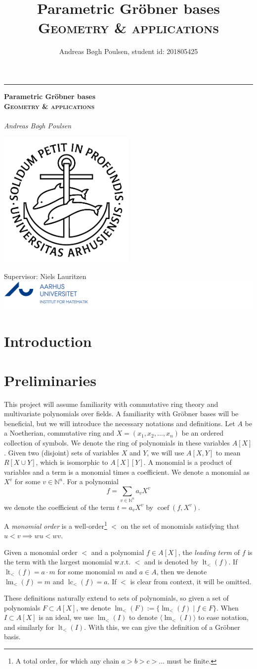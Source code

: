 \documentclass[a4paper, 12pt]{article}
\title{Parametric Gröbner bases\\{\large \textsc{Geometry \& applications}}}
\author{Andreas Bøgh Poulsen, student id: 201805425}
\newcommand{\N}{\mathbb{N}}
\DeclareMathOperator{\LT}{lt}
\DeclareMathOperator{\LM}{lm}
\DeclareMathOperator{\LC}{lc}
\DeclareMathOperator{\coef}{coef}
\theoremstyle{changedot}
\theoremstyle{changedotbreak}
\theoremstyle{nonumberplain}
\newcommand*{\titleGM}{%
\hspace*{0.2\textwidth} %
\rule{1pt}{\textheight} %
\hspace*{0.05\textwidth} %
\parbox[b]{0.75\textwidth}{ %
{\noindent\Huge\bfseries  Parametric Gröbner bases\\{\large \textsc{Geometry \& applications}}\\}\\[2\baselineskip] %
{\large \textit{Andreas Bøgh Poulsen \hfill \oldstylenums{201805425} }}\\%
{\large } %
\parbox[b][0pt]{0.5\textwidth}{
  \hspace{2cm}\includegraphics[width=0.5\textwidth]{ausegl_sort.png}
  \vspace{-10cm}
}

\vspace{0.5\textheight} %
\vfill
{\noindent Supervisor: Niels Lauritzen \hspace{2.5cm} \includegraphics{AU_logo.png}  }\\[\baselineskip] %
}%
}
\begin{document}
{}
\titleGM
\newpage
\tableofcontents

\newpage
{}

\section*{Introduction}


\section{Preliminaries}
This project will assume familiarity with commutative ring theory and multivariate polynomials over fields. A familiarity with Gröbner bases will be beneficial, but we will introduce the necessary notations and definitions. Let $A$ be a Noetherian, commutative ring and $X = (x_{1}, x_{2}, \dots, x_{n})$ be an ordered collection of symbols. We denote the ring of polynomials in these variables $A[X]$. Given two (disjoint) sets of variables $X$ and $Y$, we will use $A[X, Y]$ to mean $R[X \cup Y]$, which is isomorphic to $A[X][Y]$. A monomial is a product of variables and a term is a monomial times a coefficient. We denote a monomial as $X^{v}$ for some $v \in \N^{n}$. For a polynomial \[f = \sum_{v \in \N^{n}} a_{v}X^{v}\] we denote the coefficient of the term $t = a_{v}X^{v}$ by $\coef(f, X^{v})$.

\begin{definition}
  A \textit{monomial order} is a well-order\footnote{A total order, for which any chain $a > b > c > \dots$ must be finite.} $<$ on the set of monomials satisfying that $u < v \implies wu < wv$.

  Given a monomial order $<$ and a polynomial $f \in A[X]$, the \textit{leading term} of $f$ is the term with the largest monomial w.r.t. $<$ and is denoted by $\LT_{<}(f)$. If $\LT_{<}(f) = a\cdot m$ for some monomial $m$ and $a \in A$, then we denote $\LM_{<}(f) = m$ and $\LC_{<}(f) = a$. If $<$ is clear from context, it will be omitted.
\end{definition}

These definitions naturally extend to sets of polynomials, so given a set of polynomials $F \subset A[X]$, we denote $\LM_{<}(F) := \{\LM_{<}(f) \mid f \in F\}$. When $I \subset A[X]$ is an ideal, we use $\LM_{<}(I)$ to denote $\langle \LM_{<}(I) \rangle$ to ease notation, and similarly for $\LT_{<}(I)$. With this, we can give the definition of a Gröbner basis.
\end{document}
